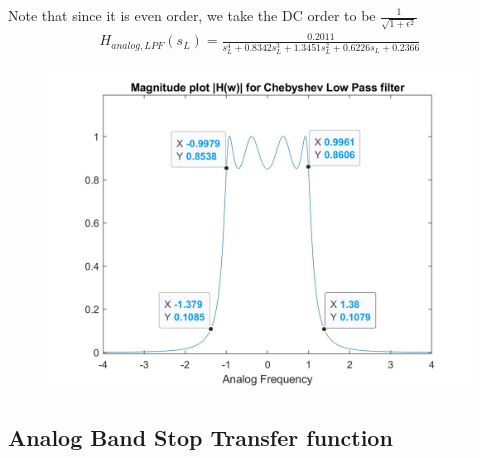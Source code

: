 \documentclass[12pt]{article}
\begin{document}
	\noindent Note that since it is even order, we take the DC order to be $\frac{1}{\sqrt{1+\epsilon^2}}$
	\begin{gather*}
		H_{analog,LPF}(s_{L}) = \frac{0.2011}{s_L^4 + 0.8342s_L^3 + 1.3451s_L^2 + 0.6226s_L + 0.2366}	
	\end{gather*}
	
	\begin{figure}[H]
		\centering
		\includegraphics[width = 12cm]{Filter2ALPF.jpg}
	\end{figure}

	\color{cyan}
	\subsection{Analog Band Stop Transfer function}
	\color{black}
	
\end{document}
